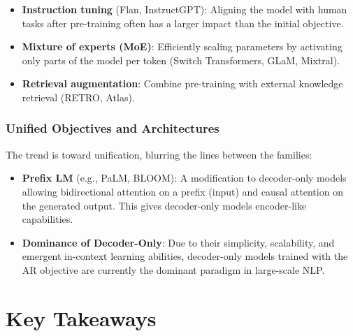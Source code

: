 \documentclass{article}
\begin{document}
\begin{itemize}
\item \textbf{Instruction tuning} (Flan, InstructGPT): Aligning the model with human tasks after pre-training often has a larger impact than the initial objective.
\item \textbf{Mixture of experts (MoE)}: Efficiently scaling parameters by activating only parts of the model per token (Switch Transformers, GLaM, Mixtral).
\item \textbf{Retrieval augmentation}: Combine pre-training with external knowledge retrieval (RETRO, Atlas).
\end{itemize}

\subsubsection{Unified Objectives and Architectures}

The trend is toward unification, blurring the lines between the families:

\begin{itemize}
\item \textbf{Prefix LM} (e.g., PaLM, BLOOM): A modification to decoder-only models allowing bidirectional attention on a prefix (input) and causal attention on the generated output. This gives decoder-only models encoder-like capabilities.
\item \textbf{Dominance of Decoder-Only}: Due to their simplicity, scalability, and emergent in-context learning abilities, decoder-only models trained with the AR objective are currently the dominant paradigm in large-scale NLP.
\end{itemize}

\section{Key Takeaways}
\end{document}
